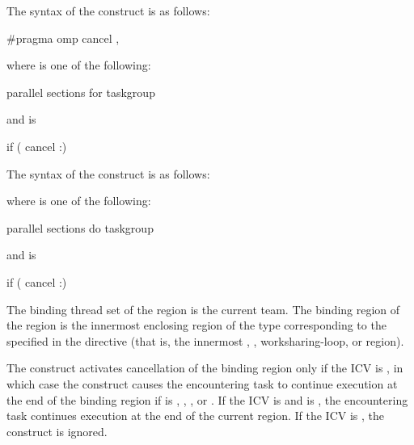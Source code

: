 \syntax
\begin{ccppspecific}
The syntax of the  construct is as follows:

\begin{ompcPragma}
#pragma omp cancel \plc{construct-type-clause [ [},\plc{] if-clause] new-line}
\end{ompcPragma}

\begin{samepage}
where  is one of the following:

\begin{indentedcodelist}
parallel
sections
for
taskgroup
\end{indentedcodelist}
\end{samepage}

and  is
\begin{indentedcodelist}
if (\plc{[} cancel :\plc{] scalar-expression})
\end{indentedcodelist}
\end{ccppspecific}

\begin{fortranspecific}
The syntax of the  construct is as follows:



\begin{samepage}
where  is one of the following:
\begin{indentedcodelist}
parallel
sections
do
taskgroup
\end{indentedcodelist}
\end{samepage}

and  is
\begin{indentedcodelist}
if (\plc{[} cancel :\plc{] scalar-logical-expression})
\end{indentedcodelist}
\end{fortranspecific}


\binding
The binding thread set of the  region is the current team.
The binding region of the  region is the innermost enclosing 
region of the type corresponding to the 
specified in the directive (that is, the innermost , 
, worksharing-loop, or  region).

\descr
The  construct activates cancellation of the binding region 
only if the  ICV is , in which case the  
construct causes the encountering task to continue execution at the end of the 
binding region if  is , , 
, or . If the  ICV is  and 
 is , the encountering task 
continues execution at the end of the current  region. If the 
 ICV is , the  construct is ignored.

